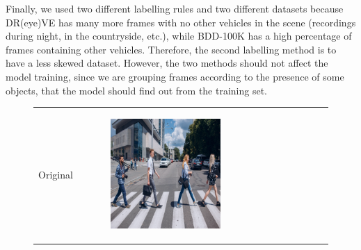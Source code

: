 Finally, we used two different labelling rules and two different datasets because 
DR(eye)VE has many more frames with no other vehicles in the scene (recordings 
during night, in the countryside, etc.), while BDD-100K has a high percentage of 
frames containing other vehicles. Therefore, the second labelling method is to 
have a less skewed dataset.
However, the two methods should not affect the model training, since we are 
grouping frames according to the presence of some objects, that the model should 
find out from the training set.
%
\newlength{\subfigwidth}
\setlength{\subfigwidth}{32mm}
\newlength{\horspace}
\setlength{\horspace}{.25\textwidth}
\begin{figure}
    \caption[Attention maps for a pre-trained multi-head ViT.]
    {Attention masks for a pre-trained multi-head ViT \cite{attention_vit}.}
    \centering
    \begin{tabular}{r p{\horspace} p{\horspace} p{\horspace}}
    Original & 
    \begin{subfigure}[b]{\subfigwidth}
        \includegraphics[width=\subfigwidth]{images/vit_attention/1/img.png}
    \end{subfigure}
    \hfill &
    \begin{subfigure}[b]{\subfigwidth}

\end{subfigure}
\end{tabular}
\end{figure}

